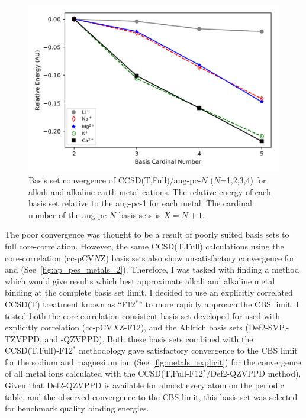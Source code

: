 \begin{figure}[!htbp]
  \centering
    \includegraphics[width=\textwidth]{figures/pes_metals}
    \caption[Basis set convergence for alkali and alkaline earth-metal
    cations.]{Basis set convergence of CCSD(T,Full)/aug-pc-$N$ ($N$=1,2,3,4)
    for alkali and alkaline earth-metal cations. The relative energy of each
    basis set relative to the aug-pc-1 for each metal. The cardinal number of
    the aug-pc-$N$ basis sets is $X=N+1$.} \label{fig:ap_pes_metals}
\end{figure}

The poor convergence was thought to be a result of poorly suited basis sets to
full core-correlation. However, the same CCSD(T,Full) calculations using the
core-correlation (cc-pCV$N$Z) basis sets also show unsatisfactory convergence
for  and  (See~\ref{fig:ap_pes_metals_2}). Therefore, I was
tasked with finding a method which would give results which best approximate
alkali and alkaline metal binding at the complete basis set limit. I decided to
use an explicitly correlated CCSD(T) treatment known as ``F12$^*$'' to more
rapidly approach the CBS limit.\cite{Tenno2012} I tested both the
core-correlation consistent basis set developed for used with explicitly
correlation (cc-pCV$X$Z-F12),\cite{Peterson2008} and the Ahlrich basis sets
(Def2-SVP,-TZVPPD, and -QZVPPD).\cite{Rappoport2010} Both these basis sets
combined with the CCSD(T,Full)-F12$^*$ methodology gave satisfactory convergence
to the CBS limit for the sodium and magnesium ion
(See~\ref{fig:metals_explicit}) for the convergence of all metal ions calculated
with the CCSD(T,Full-F12$^*$/Def2-QZVPPD method). Given that Def2-QZVPPD is
available for almost every atom on the periodic table, and the observed
convergence to the CBS limit, this basis set was selected for benchmark quality
binding energies.

